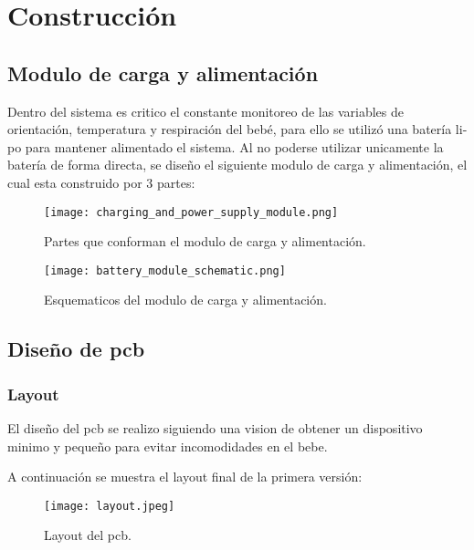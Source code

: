 \section{Construcción}

\subsection{Modulo de carga y alimentación}

Dentro del sistema es critico el constante monitoreo de las variables de orientación,
temperatura y respiración del bebé, para ello se utilizó una batería \acrshort{li-po} para mantener
alimentado el sistema. Al no poderse utilizar unicamente la batería de forma directa, se
diseño el siguiente modulo de carga y alimentación, el cual esta construido por 3 partes:

\begin{figure}[htp!]
    \centering
    \texttt{[image: charging\_and\_power\_supply\_module.png]}
    \caption{Partes que conforman el modulo de carga y alimentación.}
    \label{fig: charging_and_power_module}
\end{figure}
\FloatBarrier

\begin{figure}[htp!]
    \centering
    \texttt{[image: battery\_module\_schematic.png]}
    \caption{Esquematicos del modulo de carga y alimentación.}
    \label{fig: battery_module_schematic}
\end{figure}
\FloatBarrier

\subsection{Diseño de \acrshort{pcb}}

\subsubsection{Layout}
El diseño del \acrshort{pcb} se realizo siguiendo una vision de obtener un dispositivo
minimo y pequeño para evitar incomodidades en el bebe.

A continuación se muestra el layout final de la primera versión:

\begin{figure}[htp!]
    \centering
    \texttt{[image: layout.jpeg]}
    \caption{Layout del \acrshort{pcb}.}
    \label{fig: layout}
\end{figure}
\FloatBarrier

